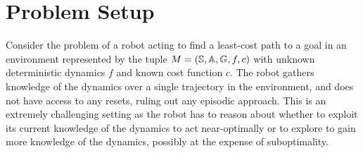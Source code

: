 
\section{Problem Setup}
\label{sec:problem-setup}

Consider the problem of a robot acting to find a least-cost path to a
goal in an environment represented
by the tuple $M = (\mathbb{S}, \mathbb{A}, \mathbb{G}, f, c)$ with unknown
deterministic dynamics $f$ and known cost function $c$. The robot
gathers knowledge of the dynamics over a single
trajectory in the environment, and does not have access to any
resets, ruling out any episodic approach.
This is an extremely challenging setting as the robot has to reason
about whether to exploit its current knowledge of the dynamics to act
near-optimally or to explore to gain more knowledge of the dynamics,
possibly at the expense of suboptimality.

